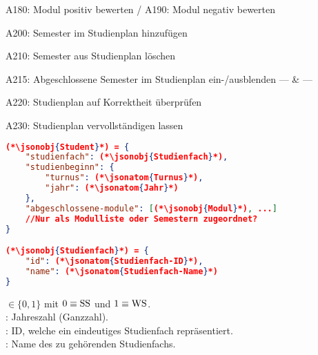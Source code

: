\begin{restusecase}{A180: Modul positiv bewerten / A190: Modul negativ bewerten}
	
\end{restusecase}

\begin{restusecase}{A200: Semester im Studienplan hinzufügen}
	
\end{restusecase}

\begin{restusecase}{A210: Semester aus Studienplan löschen}
	
\end{restusecase}

\begin{restusecase}{A215: Abgeschlossene Semester im Studienplan ein-/ausblenden}
	--- & ---
\end{restusecase}

\begin{restusecase}{A220: Studienplan auf Korrektheit überprüfen}
	
\end{restusecase}

\begin{restusecase}{A230: Studienplan vervollständigen lassen}
	
\end{restusecase}



\begin{lstlisting}[language=json,firstnumber=1]
(*\jsonobj{Student}*) = {
	"studienfach": (*\jsonobj{Studienfach}*),
	"studienbeginn": {
		"turnus": (*\jsonatom{Turnus}*),
		"jahr": (*\jsonatom{Jahr}*)
	},
	"abgeschlossene-module": [(*\jsonobj{Modul}*), ...]
	//Nur als Modulliste oder Semestern zugeordnet?
}

(*\jsonobj{Studienfach}*) = {
	"id": (*\jsonatom{Studienfach-ID}*),
	"name": (*\jsonatom{Studienfach-Name}*)
}
\end{lstlisting}

 $ \in \{0, 1\}$ mit $0 \equiv \textnormal{SS}$ und $1 \equiv \textnormal{WS}$. \\
: Jahreszahl (Ganzzahl). \\
: ID, welche ein eindeutiges Studienfach repräsentiert. \\
: Name des zu  gehörenden Studienfachs. \\